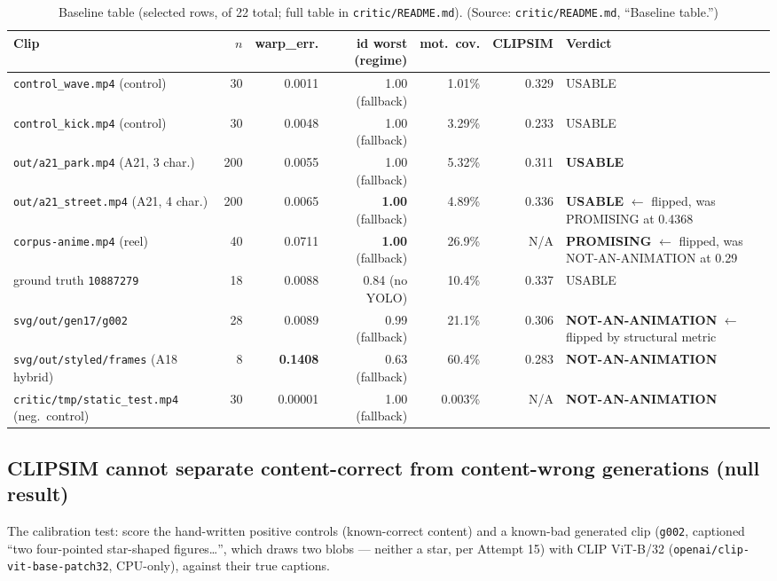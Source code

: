 \documentclass[11pt]{article}
\begin{document}
\begin{table}[h]
\centering
\footnotesize
\caption{Baseline table (selected rows, of 22 total; full table in
\texttt{critic/README.md}). (Source: \texttt{critic/README.md}, ``Baseline
table.'')}
\label{tab:baseline}
\begin{tabular}{@{}L{4.3cm}rrrrrl@{}}
\toprule
Clip & $n$ & warp\_err. & id worst (regime) & mot.\ cov. & CLIPSIM & Verdict \\
\midrule
\texttt{control\_wave.mp4} (control) & 30 & 0.0011 & 1.00 (fallback) & 1.01\% & 0.329 & USABLE \\
\texttt{control\_kick.mp4} (control) & 30 & 0.0048 & 1.00 (fallback) & 3.29\% & 0.233 & USABLE \\
\texttt{out/a21\_park.mp4} (A21, 3 char.) & 200 & 0.0055 & 1.00 (fallback) & 5.32\% & 0.311 & \textbf{USABLE} \\
\texttt{out/a21\_street.mp4} (A21, 4 char.) & 200 & 0.0065 & \textbf{1.00} (fallback) & 4.89\% & 0.336 & \textbf{USABLE} $\leftarrow$ flipped, was PROMISING at 0.4368 \\
\texttt{corpus-anime.mp4} (reel) & 40 & 0.0711 & \textbf{1.00} (fallback) & 26.9\% & N/A & \textbf{PROMISING} $\leftarrow$ flipped, was NOT-AN-ANIMATION at 0.29 \\
ground truth \texttt{10887279} & 18 & 0.0088 & 0.84 (no YOLO) & 10.4\% & 0.337 & USABLE \\
\texttt{svg/out/gen17/g002} & 28 & 0.0089 & 0.99 (fallback) & 21.1\% & 0.306 & \textbf{NOT-AN-ANIMATION} $\leftarrow$ flipped by structural metric \\
\texttt{svg/out/styled/frames} (A18 hybrid) & 8 & \textbf{0.1408} & 0.63 (fallback) & 60.4\% & 0.283 & \textbf{NOT-AN-ANIMATION} \\
\texttt{critic/tmp/static\_test.mp4} (neg.\ control) & 30 & 0.00001 & 1.00 (fallback) & 0.003\% & N/A & \textbf{NOT-AN-ANIMATION} \\
\bottomrule
\end{tabular}
\end{table}

\subsection{CLIPSIM cannot separate content-correct from content-wrong generations (null result)}
\label{sec:clipsim}

The calibration test: score the hand-written positive controls
(known-correct content) and a known-bad generated clip (\texttt{g002},
captioned ``two four-pointed star-shaped figures\ldots'', which draws two
blobs --- neither a star, per Attempt 15) with CLIP ViT-B/32
(\texttt{openai/clip-vit-base-patch32}, CPU-only), against their true
captions.
\end{document}
